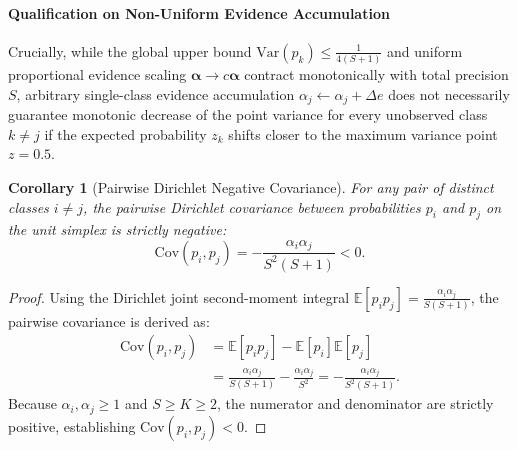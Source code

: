 \documentclass[conference]{IEEEtran}
\newtheorem{corollary}{Corollary}
\begin{document}
\paragraph{Qualification on Non-Uniform Evidence Accumulation} Crucially, while the global upper bound $\mathrm{Var}(p_k) \le \frac{1}{4(S+1)}$ and uniform proportional evidence scaling $\boldsymbol{\alpha} \to c\boldsymbol{\alpha}$ contract monotonically with total precision $S$, arbitrary single-class evidence accumulation $\alpha_j \leftarrow \alpha_j + \Delta e$ does not necessarily guarantee monotonic decrease of the point variance for every unobserved class $k \neq j$ if the expected probability $z_k$ shifts closer to the maximum variance point $z = 0.5$.

\begin{corollary}[Pairwise Dirichlet Negative Covariance]
For any pair of distinct classes $i \ne j$, the pairwise Dirichlet covariance between probabilities $p_i$ and $p_j$ on the unit simplex is strictly negative:
\begin{equation}
\mathrm{Cov}(p_i, p_j) = -\frac{\alpha_i \alpha_j}{S^2 (S + 1)} < 0.
\end{equation}
\end{corollary}
\begin{proof}
Using the Dirichlet joint second-moment integral $\mathbb{E}[p_i p_j] = \frac{\alpha_i \alpha_j}{S(S+1)}$, the pairwise covariance is derived as:
\begin{align}
\mathrm{Cov}(p_i, p_j) &= \mathbb{E}[p_i p_j] - \mathbb{E}[p_i]\mathbb{E}[p_j] \nonumber \\
&= \frac{\alpha_i \alpha_j}{S(S+1)} - \frac{\alpha_i \alpha_j}{S^2} = -\frac{\alpha_i \alpha_j}{S^2 (S + 1)}.
\end{align}
Because $\alpha_i, \alpha_j \ge 1$ and $S \ge K \ge 2$, the numerator and denominator are strictly positive, establishing $\mathrm{Cov}(p_i, p_j) < 0$.
\end{proof}
\end{document}
